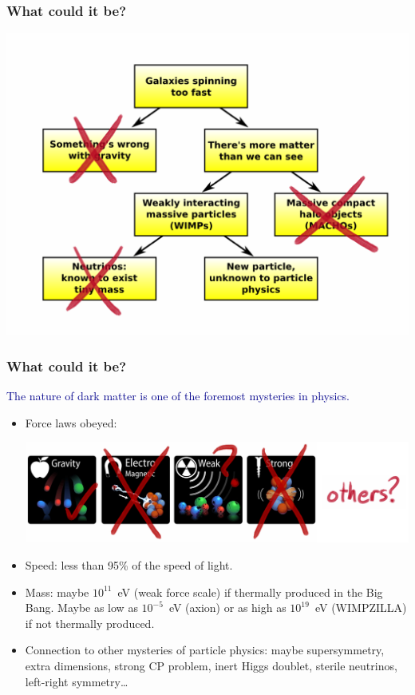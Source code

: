 \documentclass[compress]{beamer}
\begin{document}
\begin{frame}
\frametitle{What could it be?}
\begin{center}
\includegraphics[width=\linewidth]{pictures/flow_chart_3_X.png}
\end{center}
\end{frame}

\begin{frame}
\frametitle{What could it be?}

\textcolor{darkblue}{The nature of dark matter is one of the foremost mysteries in physics.}

\begin{itemize}
\item Force laws obeyed:

\includegraphics[width=\linewidth]{pictures/four_forces.png}

\item Speed: less than 95\% of the speed of light.

\item Mass: maybe $10^{11}$~eV (weak force scale) if thermally produced
  in the Big Bang.  Maybe as low as $10^{-5}$~eV (axion) or as high as
  $10^{19}$~eV (WIMPZILLA) if not thermally produced.

\item Connection to other mysteries of particle physics: maybe
  supersymmetry, extra dimensions, strong CP problem, inert Higgs
  doublet, sterile neutrinos, left-right symmetry\ldots
\end{itemize}
\end{frame}
\end{document}
